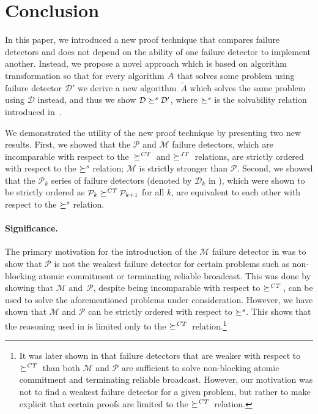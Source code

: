 \documentclass[11pt]{article}
\newcommand{\ident}[1]{\textit{#1}\rule{0cm}{1ex}}
\newcommand{\D}{\mathcal{D}}
\newcommand{\PFD}{\ensuremath{\mathcal{P}}}
\newcommand{\MFD}{\ensuremath{\mathcal{M}}}
\newcommand{\TrAlg}{\widetilde{A}}
\newcommand{\redCT}{\succeq^\ident{CT}}
\newcommand{\redJT}{\succeq^\ident{JT}}
\newcommand{\redSolv}{\succeq^{\ident{s}}}
\begin{document}
\section{Conclusion}

In this paper, we introduced a new proof technique that compares
     failure detectors and does not depend on the ability of one
     failure detector to implement another.
Instead, we propose a novel approach which is based on algorithm
     transformation  so that for every algorithm $A$ that solves
     some problem using failure detector $\D'$ we derive a new
     algorithm~$\TrAlg$ which solves the same problem using $\D$
     instead, and thus we show $\D \redSolv \D'$, where $\redSolv$ is
     the solvability relation introduced
     in~\cite{charron-bost:10:isolt}.

We demonstrated the utility of the new proof technique by presenting
     two new results.
First, we showed that the $\PFD$ and $\MFD$ failure detectors, which
     are incomparable with respect to the~$\redCT$ and $\redJT$ relations,
     are strictly ordered with respect to the $\redSolv$ relation;
     $\MFD$ is strictly stronger than $\PFD$.
Second, we showed that the $\PFD_k$ series of failure detectors
     (denoted by $\D_k$ in \cite{bhatt:oteow}), which were shown to be
     strictly ordered as $\PFD_k \redCT \PFD_{k+1}$ for all $k$, are
     equivalent to each other with respect to the $\redSolv$ relation.

\paragraph{Significance.}

The primary motivation for the introduction of the $\MFD$ failure
     detector in \cite{guer:01:hfap} was to show that $\PFD$ is not
     the weakest failure detector for certain problems such as
     non-blocking atomic commitment or terminating reliable broadcast.
This was done by showing that $\MFD$ and~$\PFD$, despite being
     incomparable with respect to $\redCT$, can be used to solve the
     aforementioned problems under consideration.
However, we have shown that $\MFD$ and $\PFD$ can be strictly ordered
     with respect to $\redSolv$.
This shows that the reasoning used in \cite{guer:01:hfap} is limited
     only to the  $\redCT$ relation.\footnote{It was later shown in
     \cite{larrea:otwfd} that failure detectors that are weaker with
     respect to $\redCT$ than both $\MFD$ and $\PFD$ are sufficient to
     solve non-blocking atomic commitment and terminating reliable
     broadcast.
However, our motivation was not to find a weakest failure detector for
     a given problem, but rather to make explicit that certain proofs
     are limited to the $\redCT$ relation.} 
\end{document}
